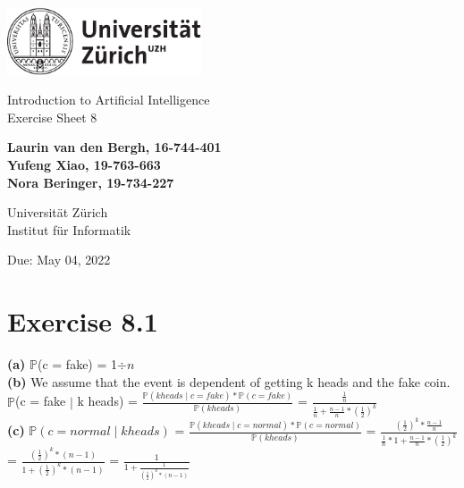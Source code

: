 \documentclass[12pt]{article}
\begin{document}
\begin{titlepage}
\includegraphics[height=20mm]{../images/uzh_logo}\\

\begin{flushleft}

\vspace{2cm}

{\Large Introduction to Artificial Intelligence\\Exercise Sheet 8}\\

\vspace{4cm}

\textbf{Laurin van den Bergh, 16-744-401\\Yufeng Xiao, 19-763-663\\Nora Beringer, 19-734-227}\\

\vspace{2cm}

Universität Zürich\\
Institut für Informatik

\vfill Due: May 04, 2022

\vspace{3cm}


\end{flushleft}
\end{titlepage}

\newpage

\section*{Exercise 8.1}

\textbf{(a)} $\mathbb{P}$(c = fake) = 1$\div n$\\
\textbf{(b)} We assume that the event is dependent of getting k heads and the fake coin.\\
$\mathbb{P}$(c = fake $\mid$ k heads) = $\frac{\mathbb{P}(k heads \mid c = fake) * \mathbb{P}(c = fake)}{\mathbb{P}(k heads)}$ = $\frac{\frac{1}{n}}{\frac{1}{n} + \frac{n-1}{n} * (\frac{1}{2})^{k}}$\\
\textbf{(c)} $\mathbb{P}(c = normal \mid k heads)$ = $\frac{\mathbb{P}(k heads \mid c = normal) * \mathbb{P}(c = normal)}{\mathbb{P}(k heads)}$ = $\frac{(\frac{1}{2})^{k} * \frac{n-1}{n}}{\frac{1}{n} * 1 + \frac{n-1}{n} * (\frac{1}{2})^{k}}$ = $\frac{(\frac{1}{2})^{k} * (n-1)}{1+(\frac{1}{2})^{k}*(n-1)}$ = $\frac{1}{1+\frac{1}{(\frac{1}{2})^{k}*(n-1)}}$
\end{document}
